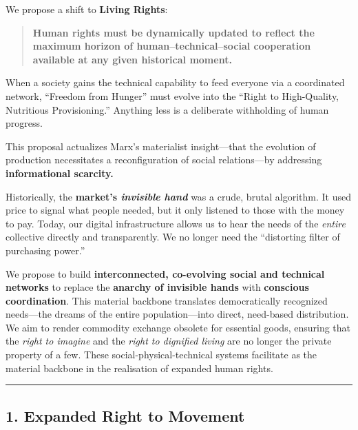We propose a shift to \textbf{Living Rights}:

\begin{quote}
\textbf{Human rights must be dynamically updated to reflect the maximum
horizon of human--technical--social cooperation available at any given
historical moment.}
\end{quote}

When a society gains the technical capability to feed everyone via a
coordinated network, ``Freedom from Hunger'' must evolve into the
``Right to High-Quality, Nutritious Provisioning.'' Anything less is a
deliberate withholding of human progress.

This proposal actualizes Marx's materialist insight---that the evolution
of production necessitates a reconfiguration of social relations---by
addressing \textbf{informational scarcity.}

Historically, the \textbf{market's \emph{invisible hand}} was a crude,
brutal algorithm. It used price to signal what people needed, but it
only listened to those with the money to pay. Today, our digital
infrastructure allows us to hear the needs of the \emph{entire}
collective directly and transparently. We no longer need the
``distorting filter of purchasing power.''

We propose to build \textbf{interconnected, co-evolving social and
technical networks} to replace the \textbf{anarchy of invisible hands}
with \textbf{conscious coordination}. This material backbone translates
democratically recognized needs---the dreams of the entire
population---into direct, need-based distribution. We aim to render
commodity exchange obsolete for essential goods, ensuring that the
\emph{right to imagine} and the \emph{right to dignified living} are no
longer the private property of a few. These social-physical-technical
systems facilitate as the material backbone in the realisation of
expanded human rights.

\begin{center}\rule{0.5\linewidth}{0.5pt}\end{center}

\subsection{1. Expanded Right to
Movement}\label{expanded-right-to-movement}

